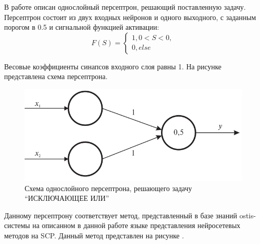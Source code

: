 В работе  описан однослойный персептрон, решающий поставленную задачу. Персептрон состоит из двух входных нейронов и одного выходного, с заданным порогом в 0.5 и сигнальной функцией активации:
\begin{equation*}
	F(S) =
	\begin{cases}
		1, 0 < S < 0,\\
		0, else
	\end{cases}
\end{equation*}

Весовые коэффициенты синапсов входного слоя равны 1. На рисунке  представлена схема персептрона.

\begin{figure}
	\centering
	\includegraphics[width=0.5\linewidth]{author/part3/figures/strong_or_ann.png}
	\caption{Схема однослойного персептрона, решающего задачу ``ИСКЛЮЧАЮЩЕЕ ИЛИ''}
	\label{fig:strong_or_ann}
\end{figure}

Данному персептрону соответствует метод, представленный в базе знаний ostis-системы на описанном в данной работе языке представления нейросетевых методов на SCP. Данный метод представлен на рисунке .

